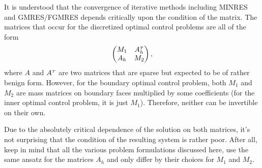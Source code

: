 \documentclass[../thesis.tex]{subfiles}
\begin{document}
It is understood that the convergence of iterative methods including MINRES and GMRES\slash{}FGMRES depends critically upon the condition of the matrix.
The matrices that occur for the discretized optimal control problems are all of the form
\[
	\begin{pmatrix}
		M_1 & A_h^\tp \\
		A_h & M_2
	\end{pmatrix},
\]
where $A$ and $A^\tp$ are two matrices that are sparse but expected to be of rather benign form.
However, for the boundary optimal control problem, both $M_1$ and $M_2$ are mass matrices on boundary faces multiplied by some coefficients (for the inner optimal control problem, it is just $M_1$).
Therefore, neither can be invertible on their own.

Due to the absolutely critical dependence of the solution on both matrices, it's not surprising that the condition of the resulting system is rather poor.
After all, keep in mind that all the various problem formulations discussed here, use the same ansatz for the matrices $A_h$ and only differ by their choices for $M_1$ and $M_2$.
\end{document}

